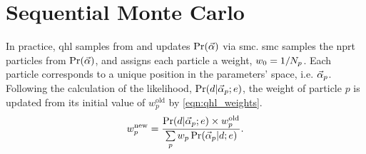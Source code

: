 \section{Sequential Monte Carlo}\label{sec:smc}
In practice, \gls{qhl} samples from and updates $\Pr(\vec{\alpha})$  via \gls{smc}.
\gls{smc} samples the \gls{nprt} \glspl{particle} from $\Pr(\vec{\alpha})$, and assigns each \gls{particle} a weight, $w_0 = 1/N_p$.
Each \gls{particle} corresponds to a unique position in the parameters' space, i.e. $\vec{\alpha}_p$.
Following the calculation of the likelihood, $\Pr(d | \vec{\alpha}_p; e)$, 
    the weight of \gls{particle} $p$ is updated from its initial value of $w_p^{\textrm{old}}$ by \cref{eqn:qhl_weights}.
\begin{equation}\label{eqn:qhl_weights}
    w_p^{\textrm{new}} = \frac{\Pr(d | \vec{\alpha}_p; e) \times w_p^{\textrm{old}} } { \sum\limits_{p} w_p \Pr(\vec{\alpha}_p | d; e) }.
\end{equation}

